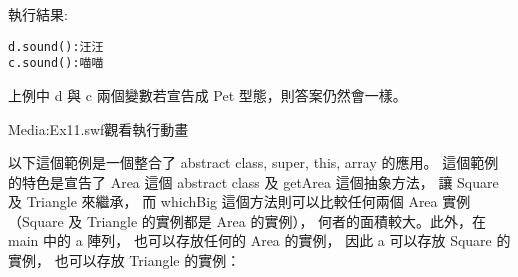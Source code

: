 \documentclass[a4paper,12pt,english]{sphinxmanual}
\begin{document}
執行結果:

\begin{Verbatim}[commandchars=@\[\]]
d.sound():汪汪
c.sound():喵喵
\end{Verbatim}

上例中 d 與 c 兩個變數若宣告成 Pet 型態，則答案仍然會一樣。

Media:Ex11.swf\textbar{}觀看執行動畫

以下這個範例是一個整合了 abstract class, super, this, array 的應用。
這個範例的特色是宣告了 Area 這個 abstract class 及 getArea 這個抽象方法，
讓 Square 及 Triangle 來繼承，
而 whichBig 這個方法則可以比較任何兩個 Area 實例
（Square 及 Triangle 的實例都是 Area 的實例），
何者的面積較大。此外，在 main 中的 a 陣列，
也可以存放任何的 Area 的實例，
因此 a 可以存放 Square 的實例，
也可以存放 Triangle 的實例：
\end{document}
